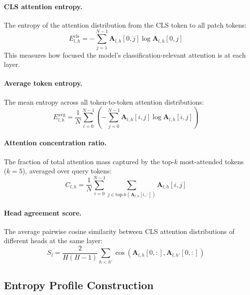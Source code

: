 \documentclass{article}
\begin{document}
\paragraph{CLS attention entropy.} The entropy of the attention distribution from the CLS token to all patch tokens:
\begin{equation}
E^{\text{cls}}_{l,h} = -\sum_{j=1}^{N-1} \mathbf{A}_{l,h}[0,j] \log \mathbf{A}_{l,h}[0,j]
\label{eq:cls_entropy}
\end{equation}
This measures how focused the model's classification-relevant attention is at each layer.

\paragraph{Average token entropy.} The mean entropy across all token-to-token attention distributions:
\begin{equation}
E^{\text{avg}}_{l,h} = \frac{1}{N}\sum_{i=0}^{N-1}\left(-\sum_{j=0}^{N-1} \mathbf{A}_{l,h}[i,j] \log \mathbf{A}_{l,h}[i,j]\right)
\label{eq:avg_entropy}
\end{equation}

\paragraph{Attention concentration ratio.} The fraction of total attention mass captured by the top-$k$ most-attended tokens ($k=5$), averaged over query tokens:
\begin{equation}
C_{l,h} = \frac{1}{N}\sum_{i=0}^{N-1} \sum_{j \in \text{top-}k(\mathbf{A}_{l,h}[i,:])} \mathbf{A}_{l,h}[i,j]
\label{eq:concentration}
\end{equation}

\paragraph{Head agreement score.} The average pairwise cosine similarity between CLS attention distributions of different heads at the same layer:
\begin{equation}
S_l = \frac{2}{H(H-1)}\sum_{h<h'} \cos(\mathbf{A}_{l,h}[0,:], \mathbf{A}_{l,h'}[0,:])
\label{eq:head_agreement}
\end{equation}

\subsection{Entropy Profile Construction}
\end{document}
